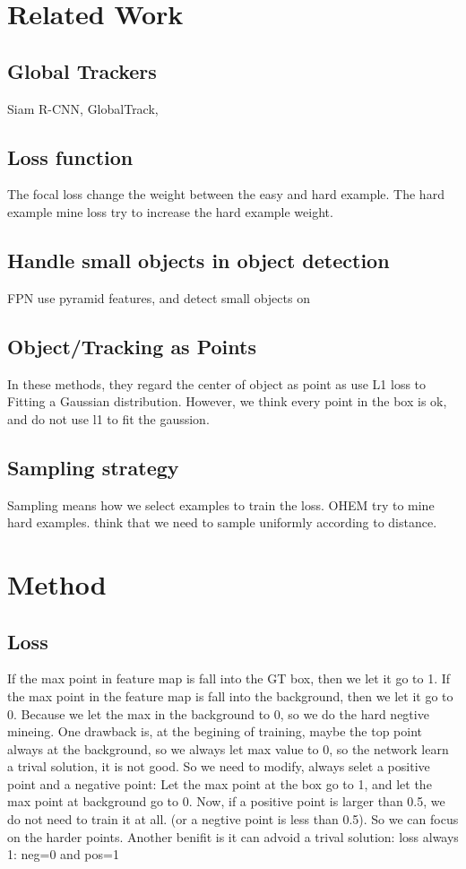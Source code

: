 \documentclass[11pt,a4paper]{article}
\begin{document}
\section{Related Work}
\subsection{Global Trackers} Siam R-CNN, GlobalTrack, 
\subsection{Loss function} The focal loss change the weight between the easy and hard example. The hard example mine loss try to increase the hard example weight.
\subsection{Handle small objects in object detection}
FPN use pyramid features, and detect small objects on 
\subsection{Object/Tracking as Points} In these methods, they regard the center of object as point as use L1 loss to Fitting a Gaussian distribution. However, we think every point in the box is ok, and do not use l1 to fit the gaussion.
\subsection{Sampling strategy} Sampling means how we select examples to train the loss. OHEM try to mine hard examples. \cite{wu2017sampling} think that we need to sample uniformly according to distance.

\section{Method}
\subsection{Loss}
If the max point in feature map is fall into the GT box, then we let it go to 1. If the max point in the feature map is fall into the background, then we let it go to 0.
Because we let the max in the background to 0, so we do the hard negtive mineing.
One drawback is, at the begining of training, maybe the top point always at the background, so we always let max value to 0, so the network learn a trival solution, it is not good. So we need to modify, always selet a positive point and a negative point: Let the max point at the box go to 1, and let the max point at background go to 0.
Now, if a positive point is larger than 0.5, we do not need to train it at all. (or a negtive point is less than 0.5). So we can focus on the harder points. Another benifit is it can advoid a trival solution: loss always 1: neg=0 and pos=1
\end{document}
